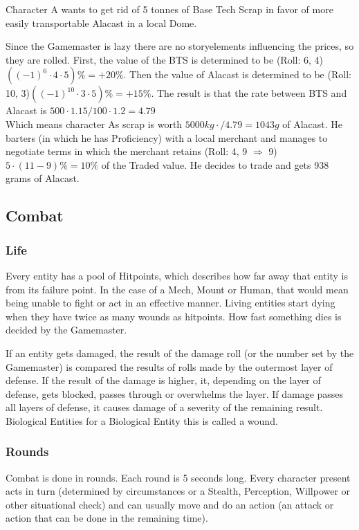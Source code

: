 \documentclass{article}
\begin{document}
    Character A wants to get rid of 5 tonnes of Base Tech Scrap in favor of more easily transportable Alacast in a local
    Dome.\par
    Since the Gamemaster is lazy there are no storyelements influencing the prices, so they are rolled. First, the value of
    the BTS is determined to be (Roll: 6, 4) \(((-1)^{6}\cdot4\cdot5) \% = +20\%\). Then the value of Alacast is determined
    to be (Roll: 10, 3)\(((-1)^{10}\cdot3\cdot5) \% = +15\%\). The result is that the rate between BTS and Alacast is
    \( 500\cdot1.15/100\cdot1.2 = 4.79\) \\ Which means character As scrap is worth
    \(5000 kg\cdot / 4.79 = 1043 g \) of Alacast. He barters (in which he has Proficiency) with a local merchant and manages to
    negotiate terms in which the merchant retains (Roll: 4, 9 \(\Rightarrow\) 9) \(5\cdot(11-9)\% = 10\%\) of the Traded
    value. He decides to trade and gets 938 grams of Alacast.\newline\newline
    \pagebreak[1]
    \subsection{Combat}

    \subsubsection{Life}
    Every entity has a pool of Hitpoints, which describes how far away that entity is from its failure point.
    In the case of a Mech, Mount or Human, that would mean being unable to fight or act in an effective manner. Living
    entities start dying when they have twice as many wounds as hitpoints. How fast something dies is decided by the
    Gamemaster.\par
    If an entity gets damaged, the result of the damage roll (or the number set by the Gamemaster) is compared the results
    of rolls made by the outermost layer of defense. If the result of the damage is higher, it, depending on the
    layer of defense, gets blocked, passes through or overwhelms the layer. If damage passes all layers of defense,
    it causes damage of a severity of the remaining result.
    Biological Entities for a Biological Entity this is called a wound.

    \subsubsection{Rounds}
    Combat is done in rounds. Each round is 5 seconds long. Every character present acts in turn (determined
    by circumstances or a Stealth, Perception, Willpower or other situational check) and can usually move and do an action
    (an attack or action that can be done in the remaining time).
\end{document}

